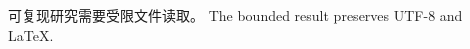 \documentclass{article}
\begin{document}
可复现研究需要受限文件读取。 The bounded result preserves UTF-8 and \LaTeX{}.
\end{document}

